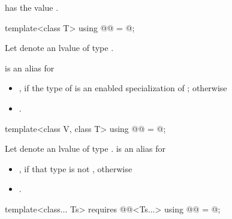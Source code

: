 \begin{itemdescr}
\pnum
{} has the value
.
\end{itemdescr}

\begin{itemdecl}
template<class T> using @@ = @\seebelow@;
\end{itemdecl}

\begin{itemdescr}
\pnum
Let  denote an lvalue of type .

\pnum
{} is an alias for
\begin{itemize}
 \item
   , if the type of  is an enabled
   specialization of ; otherwise
 \item
   .
\end{itemize}
\end{itemdescr}

\begin{itemdecl}
template<class V, class T> using @@ = @\seebelow@;
\end{itemdecl}

\begin{itemdescr}
\pnum
Let  denote an lvalue of type .
\pnum
{} is an alias for
\begin{itemize}
 \item
   , if that type is not ,
   otherwise
 \item
   .
\end{itemize}
\end{itemdescr}

\begin{itemdecl}
template<class... Ts>
  requires @@<Ts...>
    using @@ = @\seebelow@;
\end{itemdecl}

